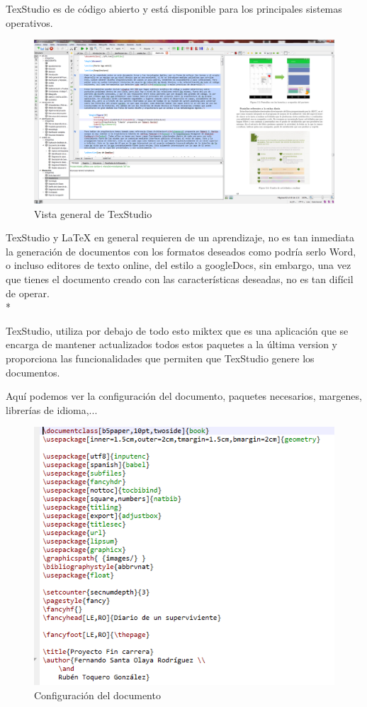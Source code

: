 \documentclass[../pfc.tex]{subfiles}
\begin{document}
	TexStudio es de código abierto y está disponible para los principales sistemas operativos.
	
	\begin{figure}[H]
		\centering
		\includegraphics[width=1\linewidth]{../images/texstructura}
		\caption{Vista general de TexStudio}
		\label{fig:texstudio}
	\end{figure}
	
	TexStudio y LaTeX en general requieren de un aprendizaje, no es tan inmediata la generación de documentos con los formatos deseados como podría serlo Word, o incluso editores de texto online, del estilo a googleDocs, sin embargo, una vez que tienes el documento creado con las características deseadas, no es tan difícil de operar.\\*
	
	\clearpage

	TexStudio, utiliza por debajo de todo esto miktex que es una aplicación que se encarga de mantener actualizados todos estos paquetes a la última version y proporciona las funcionalidades que permiten que TexStudio genere los documentos.
	
	Aquí podemos ver la configuración del documento, paquetes necesarios, margenes, librerías de idioma,...
	


	\begin{figure}[H]
		\centering
		\includegraphics[width=0.7\linewidth]{../images/texstudiopack}
		\caption{Configuración del documento}
		\label{fig:texstudioPaQ}
	\end{figure}
	
\end{document}
